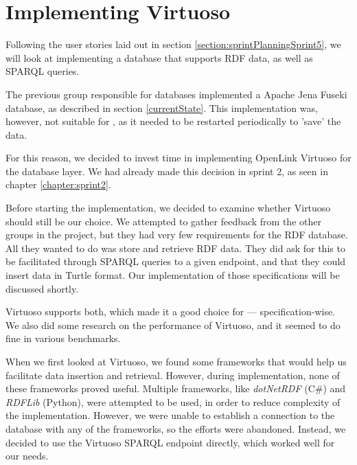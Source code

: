 \section{Implementing Virtuoso}
Following the user stories laid out in section \ref{section:sprintPlanningSprint5}, we will look at implementing a database that supports RDF data, as well as SPARQL queries.

The previous group responsible for \knox{} databases implemented a Apache Jena Fuseki database, as described in section \ref{currentState}.
This implementation was, however, not suitable for \knox{}, as it needed to be restarted periodically to 'save' the data.

For this reason, we decided to invest time in implementing OpenLink Virtuoso\cite{OpenLinkSoftwareVirtuoso} for the \knox{} database layer. We had already made this decision in sprint 2, as seen in chapter \ref{chapter:sprint2}.

Before starting the implementation, we decided to examine whether Virtuoso should still be our choice.
We attempted to gather feedback from the other groups in the \knox{} project, but they had very few requirements for the RDF database. All they wanted to do was store and retrieve RDF data.
They did ask for this to be facilitated through SPARQL queries to a given endpoint, and that they could insert data in Turtle format. Our implementation of those specifications will be discussed shortly.

Virtuoso supports both, which made it a good choice for \knox{} --- specification-wise. We also did some research on the performance of Virtuoso, and it seemed to do fine in various benchmarks\cite{addleseeComparingLinkedData2019}\cite{jovanovikBenchmarkingVirtuosoMighty2018}.

When we first looked at Virtuoso, we found some frameworks that would help us facilitate data insertion and retrieval.  However, during implementation, none of these frameworks proved useful. Multiple frameworks, like \textit{dotNetRDF} (C\#) and \textit{RDFLib} (Python), were attempted to be used, in order to reduce complexity of the implementation. However, we were unable to establish a connection to the database with any of the frameworks, so the efforts were abandoned. Instead, we decided to use the Virtuoso SPARQL endpoint directly, which worked well for our needs.

